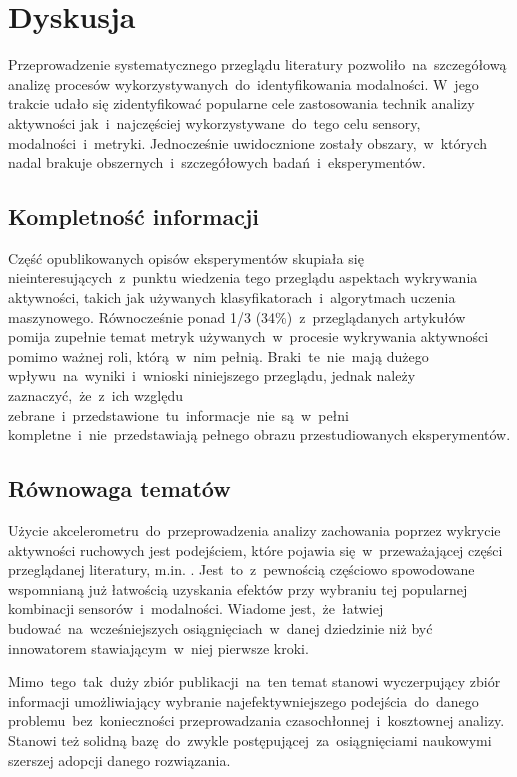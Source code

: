 \pagebreak
\section{Dyskusja}
Przeprowadzenie systematycznego przeglądu literatury pozwoliło~na~szczegółową analizę procesów wykorzystywanych~do~identyfikowania modalności. W~jego trakcie udało się zidentyfikować popularne cele zastosowania technik analizy aktywności jak~i~najczęściej wykorzystywane~do~tego celu sensory, modalności~i~metryki. Jednocześnie uwidocznione zostały obszary,~w~których nadal brakuje obszernych~i~szczegółowych badań~i~eksperymentów.

\subsection{Kompletność informacji}
Część opublikowanych opisów eksperymentów skupiała się nieinteresujących~z~punktu wiedzenia tego przeglądu aspektach wykrywania aktywności, takich jak używanych klasyfikatorach~i~algorytmach uczenia maszynowego. Równocześnie ponad 1/3 (34\%)~z~przeglądanych artykułów pomija zupełnie temat metryk używanych~w~procesie wykrywania aktywności pomimo ważnej roli, którą~w~nim pełnią. Braki~te~nie~mają dużego wpływu~na~wyniki~i~wnioski niniejszego przeglądu, jednak należy zaznaczyć,~że~z~ich względu zebrane~i~przedstawione~tu~informacje~nie~są~w~pełni kompletne~i~nie~przedstawiają pełnego obrazu przestudiowanych eksperymentów. 

\subsection{Równowaga tematów}
\label{sec:article_balance}
Użycie akcelerometru~do~przeprowadzenia analizy zachowania poprzez wykrycie aktywności ruchowych jest podejściem, które pojawia się~w~przeważającej części przeglądanej literatury, m.in. \cite{S59, S33, S29, S30, S32, S42}. Jest~to~z~pewnością częściowo spowodowane wspomnianą już łatwością uzyskania efektów przy wybraniu tej popularnej kombinacji sensorów~i~modalności. Wiadome jest,~że~łatwiej budować~na~wcześniejszych osiągnięciach~w~danej dziedzinie niż być innowatorem stawiającym~w~niej pierwsze kroki. 

Mimo~tego~tak~duży zbiór publikacji~na~ten temat stanowi wyczerpujący zbiór informacji umożliwiający wybranie najefektywniejszego podejścia~do~danego problemu~bez~konieczności przeprowadzania czasochłonnej~i~kosztownej analizy. Stanowi też solidną bazę~do~zwykle postępującej~za~osiągnięciami naukowymi szerszej adopcji danego rozwiązania.

